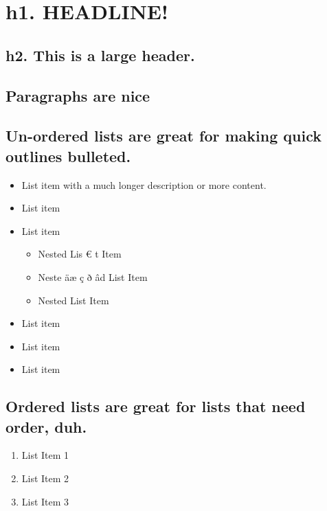 \documentclass{juwit}
\begin{document}
 \section*{h1. HEADLINE!} 
       \subsection*{h2. This is a large header.} 

       \subsection*{Paragraphs are nice} 
       \par\addvspace{\medskipamount}\noindent 
        \lipsum[1]
       
       \par\addvspace{\medskipamount}\noindent
       \lipsum[2]
       
       \par\addvspace{\medskipamount}\noindent
       \lipsum[3]

       \subsection*{Un-ordered lists are great for making quick outlines bulleted.}
       \restoregeometry
       \begin{itemize} 
         \item List item with a much longer description or more content. 
         \item List item 
         \item List item
           \begin{itemize} 
             \item Nested Lis \euro{} t Item 
             \item Neste äæ ç ð âd List Item 
             \item Nested List Item 
           \end{itemize} 
         
         \item List item 
         \item List item 
         \item List item 
       \end{itemize}
       \subsection*{Ordered lists are great for lists that need order, duh.} 
       \begin{enumerate} 
         \item List Item 1 
         \item List Item 2 
         \item List Item 3 
       \end{enumerate} 
       \par\addvspace{\medskipamount}\noindent
       \lipsum[4]
    
 
\end{document}
